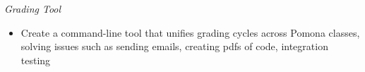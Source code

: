 {\sl Grading Tool}
\begin{itemize} \itemsep -2pt %
\item  Create a command-line tool that unifies grading cycles across Pomona classes, solving issues such as sending emails, creating pdfs of code, integration testing
\end{itemize}
